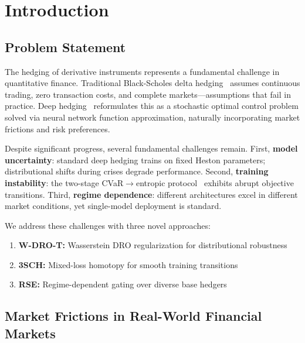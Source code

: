 
\section{Introduction}
\label{sec:introduction}

\subsection{Problem Statement}

The hedging of derivative instruments represents a fundamental challenge in quantitative finance. Traditional Black-Scholes delta hedging~\citep{black1973pricing} assumes continuous trading, zero transaction costs, and complete markets---assumptions that fail in practice. Deep hedging~\citep{buehler2019deep} reformulates this as a stochastic optimal control problem solved via neural network function approximation, naturally incorporating market frictions and risk preferences.

Despite significant progress, several fundamental challenges remain. First, \textbf{model uncertainty}: standard deep hedging trains on fixed Heston parameters; distributional shifts during crises degrade performance. Second, \textbf{training instability}: the two-stage CVaR$\to$entropic protocol~\citep{kozyra2019deep} exhibits abrupt objective transitions. Third, \textbf{regime dependence}: different architectures excel in different market conditions, yet single-model deployment is standard.

We address these challenges with three novel approaches:
\begin{enumerate}[noitemsep,leftmargin=*]
    \item \textbf{W-DRO-T:} Wasserstein DRO regularization for distributional robustness
    \item \textbf{3SCH:} Mixed-loss homotopy for smooth training transitions
    \item \textbf{RSE:} Regime-dependent gating over diverse base hedgers
\end{enumerate}

\subsection{Market Frictions in Real-World Financial Markets}

